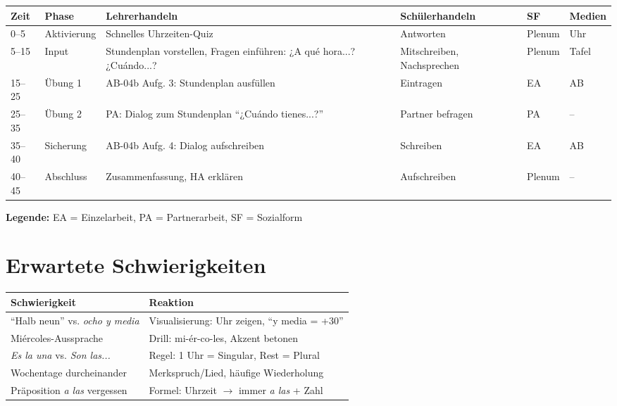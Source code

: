 \documentclass[11pt,a4paper]{article}
\begin{document}
\begin{longtable}{|p{1cm}|p{1.5cm}|p{4cm}|p{3cm}|p{2cm}|p{2cm}|}
\hline
\textbf{Zeit} & \textbf{Phase} & \textbf{Lehrerhandeln} & \textbf{Schülerhandeln} & \textbf{SF} & \textbf{Medien} \\
\hline
\endhead

0--5 & Aktivierung & Schnelles Uhrzeiten-Quiz & Antworten & Plenum & Uhr \\
\hline

5--15 & Input & Stundenplan vorstellen, Fragen einführen: ¿A qué hora...? ¿Cuándo...? & Mitschreiben, Nachsprechen & Plenum & Tafel \\
\hline

15--25 & Übung 1 & AB-04b Aufg. 3: Stundenplan ausfüllen & Eintragen & EA & AB \\
\hline

25--35 & Übung 2 & PA: Dialog zum Stundenplan ``¿Cuándo tienes...?'' & Partner befragen & PA & -- \\
\hline

35--40 & Sicherung & AB-04b Aufg. 4: Dialog aufschreiben & Schreiben & EA & AB \\
\hline

40--45 & Abschluss & Zusammenfassung, HA erklären & Aufschreiben & Plenum & -- \\
\hline
\end{longtable}

\textbf{Legende:} EA = Einzelarbeit, PA = Partnerarbeit, SF = Sozialform

\section{Erwartete Schwierigkeiten}

\begin{tabular}{|p{5cm}|p{8cm}|}
\hline
\textbf{Schwierigkeit} & \textbf{Reaktion} \\
\hline
``Halb neun'' vs. \textit{ocho y media} & Visualisierung: Uhr zeigen, ``y media = +30'' \\
\hline
Miércoles-Aussprache & Drill: mi-ér-co-les, Akzent betonen \\
\hline
\textit{Es la una} vs. \textit{Son las...} & Regel: 1 Uhr = Singular, Rest = Plural \\
\hline
Wochentage durcheinander & Merkspruch/Lied, häufige Wiederholung \\
\hline
Präposition \textit{a las} vergessen & Formel: Uhrzeit $\rightarrow$ immer \textit{a las} + Zahl \\
\hline
\end{tabular}
\end{document}
